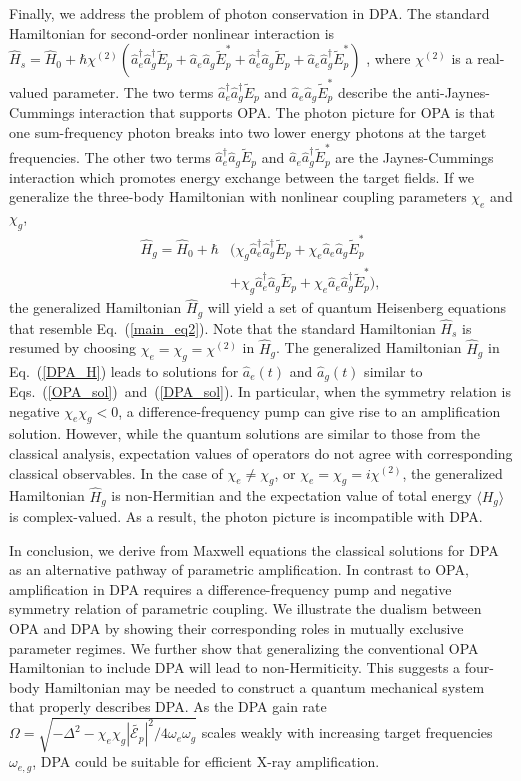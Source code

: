 \documentclass[aps,prl,nobibnotes,nofootinbib,showpacs,reprint]{revtex4-1}
\newcommand{\Eq}[1]{Eq.~(\ref{#1})}
\newcommand{\Eqs}[2]{Eqs.~(\ref{#1})~and~(\ref{#2})}
\newcommand{\Ep}{\tilde{\mathcal{E}_{p}}}
\newcommand{\we}{\omega_{e}}
\newcommand{\wg}{\omega_{g}}
\newcommand{\chie}{\chi_{e}}
\newcommand{\chig}{\chi_{g}}
\newcommand{\Dv}{\Delta}
\newcommand{\Wm}{\Omega}
\newcommand{\aue}{\hat{a}_{e}^{\dagger}}
\newcommand{\ade}{\hat{a}_{e}}
\newcommand{\aug}{\hat{a}_{g}^{\dagger}}
\newcommand{\adg}{\hat{a}_{g}}
\begin{document}
Finally, we address the problem of photon conservation in DPA. The standard Hamiltonian for second-order nonlinear interaction is $\hat{H}_{s} =  \hat{H}_{0} + \hbar \chi^{(2)} (\aue\aug \tilde{E}_{p} + \ade\adg \tilde{E}^{\ast}_{p} + \aue\adg \tilde{E}_{p} + \ade\aug \tilde{E}^{\ast}_{p})$ \cite{Gerry}, where $\chi^{(2)}$ is a real-valued parameter. The two terms $\aue\aug \tilde{E}_{p}$ and $\ade\adg \tilde{E}^{\ast}_{p}$ describe the anti-Jaynes-Cummings interaction that supports OPA. The photon picture for OPA is that one sum-frequency photon breaks into two lower energy photons at the target frequencies. The other two terms $ \aue\adg \tilde{E}_{p}$ and $\ade\aug \tilde{E}^{\ast}_{p}$ are the Jaynes-Cummings interaction which promotes energy exchange between the target fields. If we generalize the three-body Hamiltonian with nonlinear coupling parameters $\chie$ and $\chig$,
\begin{equation}\label{DPA_H}
	\begin{split}
	\hat{H}_{g} = \hat{H}_{0} + \hbar & (\chig\aue\aug \tilde{E}_{p} + \chie\ade\adg \tilde{E}^{\ast}_{p} 	\\
			   &+ \chig\aue\adg \tilde{E}_{p} + \chie\ade\aug \tilde{E}^{\ast}_{p}), 	
	\end{split}
\end{equation}
the generalized Hamiltonian $\hat{H}_{g}$ will yield a set of quantum Heisenberg equations that resemble \Eq{main_eq2}. Note that the standard Hamiltonian $\hat{H}_{s}$ is resumed by choosing $\chie = \chig = \chi^{(2)}$ in $\hat{H}_{g}$. The generalized Hamiltonian $\hat{H}_{g}$ in \Eq{DPA_H} leads to solutions for $\ade(t)$ and $\adg(t)$ similar to \Eqs{OPA_sol}{DPA_sol}. In particular, when the symmetry relation is negative $\chie\chig < 0$, a difference-frequency pump can give rise to an amplification solution. However, while the quantum solutions are similar to those from the classical analysis, expectation values of operators do not agree with corresponding classical observables. In the case of $\chie \ne \chig$, or $\chie = \chig = i\chi^{(2)}$, the generalized Hamiltonian $\hat{H}_{g}$ is non-Hermitian and the expectation value of total energy $\langle{H}_{g}\rangle$ is complex-valued. As a result, the photon picture is incompatible with DPA.

In conclusion, we derive from Maxwell equations the classical solutions for DPA as an alternative pathway of parametric amplification. In contrast to OPA, amplification in DPA requires a difference-frequency pump and negative symmetry relation of parametric coupling. We illustrate the dualism between OPA and DPA by showing their corresponding roles in mutually exclusive parameter regimes. We further show that generalizing the conventional OPA Hamiltonian to include DPA will lead to non-Hermiticity. This suggests a four-body Hamiltonian may be needed to construct a quantum mechanical system that properly describes DPA. As the DPA gain rate $\Wm = \sqrt{-\Dv^2-\chie\chig|\Ep|^2/4\we\wg}$ scales weakly with increasing target frequencies $\omega_{e,g}$, DPA could be suitable for efficient X-ray amplification. 
\end{document}

